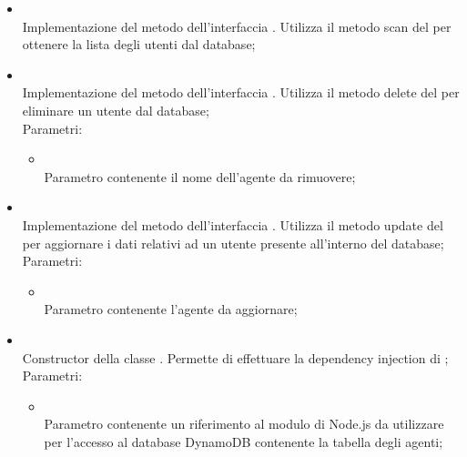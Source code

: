 \begin{itemize}
\begin{itemize}
		\item[]  \\
		Implementazione del metodo dell'interfaccia . Utilizza il metodo scan del  per ottenere la lista degli utenti dal database;\\
		\item[]  \\
		Implementazione del metodo dell'interfaccia . Utilizza il metodo delete del  per eliminare un utente dal database;\\
		Parametri:
		\begin{itemize}
			\item {} \\
			Parametro contenente il nome dell'agente da rimuovere;
		\end{itemize}
		\item[]  \\
		Implementazione del metodo dell'interfaccia . Utilizza il metodo update del  per aggiornare i dati relativi ad un utente presente all'interno del database;\\
		Parametri:
		\begin{itemize}
			\item {} \\
			Parametro contenente l'agente da aggiornare;
		\end{itemize}
		\item[]  \\
		Constructor della classe . Permette di effettuare la dependency injection di ;\\
		Parametri:
		\begin{itemize}
			\item {} \\
			Parametro contenente un riferimento al modulo di Node.js da utilizzare per l'accesso al database DynamoDB contenente la tabella degli agenti;
		\end{itemize}
	\end{itemize}
\end{itemize}


